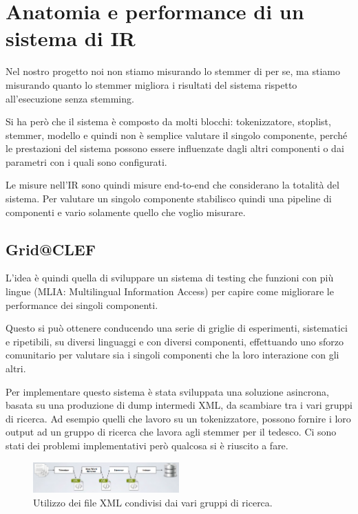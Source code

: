 

\chapter{Anatomia e performance di un sistema di IR}

Nel nostro progetto noi non stiamo misurando lo stemmer di per se, ma stiamo misurando quanto lo stemmer migliora i risultati del sistema rispetto all'esecuzione senza stemming.

Si ha però che il sistema è composto da molti blocchi: tokenizzatore, stoplist, stemmer, modello e quindi non è semplice valutare il singolo componente, perché le prestazioni del sistema possono essere influenzate dagli altri componenti o dai parametri con i quali sono configurati.

Le misure nell'IR sono quindi misure end-to-end che considerano la totalità del sistema. Per valutare un singolo componente stabilisco quindi una pipeline di componenti e vario solamente quello che voglio misurare.

\section{Grid@CLEF}

L'idea è quindi quella di sviluppare un sistema di testing che funzioni con più lingue (MLIA: Multilingual Information Access) per capire come migliorare le performance dei singoli componenti.

Questo si può ottenere conducendo una serie di griglie di esperimenti, sistematici e ripetibili, su diversi linguaggi e con diversi componenti, effettuando uno sforzo comunitario per valutare sia i singoli componenti che la loro interazione con gli altri.

Per implementare questo sistema è stata sviluppata una soluzione asincrona, basata su una produzione di dump intermedi XML, da scambiare tra i vari gruppi di ricerca. Ad esempio quelli che lavoro su un tokenizzatore, possono fornire i loro output ad un gruppo di ricerca che lavora agli stemmer per il tedesco.
Ci sono stati dei problemi implementativi però qualcosa si è riuscito a fare.

\begin{figure}[htbp]
	\centering
	\includegraphics[width=0.5\textwidth]{images/l20-fig-1}
	\caption{Utilizzo dei file XML condivisi dai vari gruppi di ricerca.}
\end{figure} 

